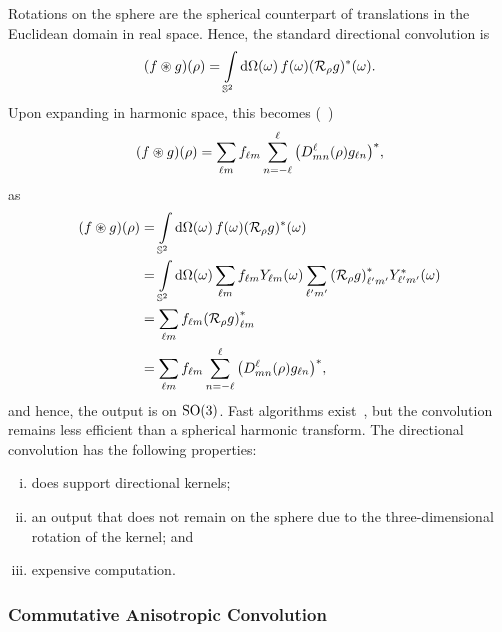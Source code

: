Rotations on the sphere are the spherical counterpart of translations in the Euclidean domain in real space.
Hence, the standard directional convolution is
%
\begin{equation}\label{eq:chapter3_directional_convolution}
	(f \circledast g)(\rho)
	= \integrateSphere{\omega} \pixel{f} \pixel{\conj{(\rotation{\rho}g)}}.
\end{equation}
%
Upon expanding in harmonic space, this becomes (\eg{}~\cite{McEwen2007,Wandelt2001})
%
\begin{equation}
	(f \circledast g) (\rho)
	= \harmonicSum \harmonic{f} \wignerSum \conj{\big(\wigner{\ell}{m}{n}(\rho) g_{\ell n}\big)},
\end{equation}
%
as
%
\begin{align}
	(f \circledast g)(\rho)
	 & = \integrateSphere{\omega} \pixel{f} \pixel{\conj{(\rotation{\rho}g)}} \nonumber{}                                                                                           \\
	 & = \integrateSphere{\omega} \harmonicSum \harmonic{f} \pixel{\harmonic{Y}} \harmonicSum['] \conj{\harmonic[']{(\rotation{\rho}g)}} \pixel{\conj{\harmonic[']{Y}}} \nonumber{} \\
	 & = \harmonicSum \harmonic{f} \conj{\harmonic{(\rotation{\rho}g)}} \nonumber{}                                                                                                 \\
	 & = \harmonicSum \harmonic{f} \wignerSum \conj{\big(\wigner{\ell}{m}{n}(\rho) g_{\ell n}\big)},
\end{align}
%
and hence, the output is on \(\rotationGroup{}\).
Fast algorithms exist~\cite{McEwen2007,Wandelt2001,Wiaux2007,McEwen2013}, but the convolution remains less efficient than a spherical harmonic transform.
The directional convolution has the following properties:
%
\begin{enumerate}[(i),nosep,left=\parindent]
	\item does support directional kernels;
	\item an output that does not remain on the sphere due to the three-dimensional rotation of the kernel; and
	\item expensive computation.
\end{enumerate}

\subsubsection{Commutative Anisotropic Convolution}

